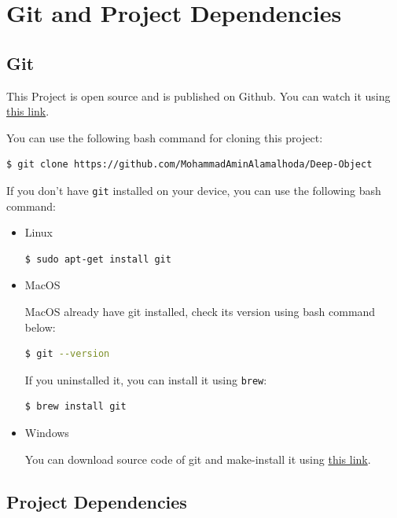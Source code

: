 \documentclass[a4paper, openany]{book}
\newcommand{\code}{\texttt}
\begin{document}
\section{Git and Project Dependencies}

\vspace{0.3cm}
\subsection{Git}
	\vspace{0.3cm}

This Project is open source and is published on Github. You can watch it using \href{https://github.com/MohammadAminAlamalhoda/Deep-Object}{this link}.

You can use the following bash command for cloning this project:

\begin{lstlisting}[language=bash]
  $ git clone https://github.com/MohammadAminAlamalhoda/Deep-Object
  \end{lstlisting}
  
If you don't have \code{git} installed on your device, you can use the following bash command:
\begin{itemize}
\item Linux
\begin{lstlisting}[language=bash]
  $ sudo apt-get install git
  \end{lstlisting}
  
\item MacOS

MacOS already have git installed, check its version using bash command below:

\begin{lstlisting}[language=bash]
  $ git --version
  \end{lstlisting}
If you uninstalled it, you can install it using \code{brew}:
\begin{lstlisting}[language=bash]
  $ brew install git
  \end{lstlisting}
\item Windows

You can download source code of git and make-install it using \href{https://git-scm.com/download/win}{this link}.
\end{itemize}



\subsection{Project Dependencies}
	\vspace{0.3cm}
\end{document}
